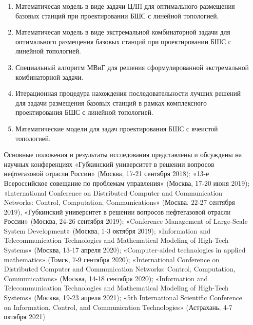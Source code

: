 \begin{enumerate}[beginpenalty=10000] %
    \item Математичесая модель в виде задачи ЦЛП для оптимального размещения базовых станций при проектировании БШС с линейной топологией.
    \item Математичесая модель в виде экстремальной комбинаторной задачи для оптимального размещения базовых станций при проектировании БШС с линейной топологией.
    \item Специальный алгоритм МВиГ для решения сформулированной
    экстремальной комбинаторной задачи.
    \item Итерационная процедура нахождения последовательности лучших
    решений для задачи размещения базовых станций в рамках комплексного
    проектирования БШС с линейной топологией.
    \item Математические модели для задач проектирования БШС с ячеистой
    топологией.
  \end{enumerate}




{\probation}
Основные положения и результаты исследования представлены и обсуждены на научных конференциях «Губкинский университет в решении вопросов нефтегазовой отрасли России» (Москва, 17-21 сентября 2018); «13-е Всероссийское совещание по проблемам управления» (Москва, 17-20 июня 2019); «International Conference on Distributed Computer and Communication Networks: Control, Computation, Communications» (Москва, 22-27 сентября 2019), «Губкинский университет в решении вопросов нефтегазовой отрасли России» (Москва, 24-26 сентября 2019); «Conference Management of Large-Scale System Development» (Москва, 1-3 октября 2019); «Information and Telecommunication Technologies and Mathematical Modeling of High-Tech Systems» (Москва, 13-17 апреля 2020); «Computer-aided technologies in applied mathematics» (Томск, 7-9 сентября 2020); «International Conference on Distributed Computer and Communication Networks: Control, Computation, Communications» (Москва, 14-18 сентября 2020); «Information and Telecommunication Technologies and Mathematical Modeling of High-Tech Systems» (Москва, 19-23 апреля 2021);  «5th International Scientific Conference on Information, Control, and Communication Technologies» (Астрахань, 4-7 октября 2021)


